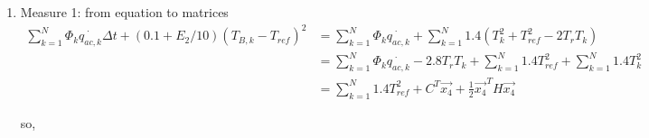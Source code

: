 \documentclass[titlepage,a4paper]{article}
\begin{document}
        \begin{enumerate}
            \item Measure 1: from equation to matrices
            \begin{equation}
                \begin{aligned}
                    \sum_{k=1}^N \Phi_k \dot{q_{ac,k}} \Delta t+(0.1+E_2/10)(T_{B,k}-T_{ref})^2 &= \sum_{k=1}^N \Phi_k \dot{q_{ac,k}}+\sum_{k=1}^N 1.4(T_k^2+T_{ref}^2-2T_r T_k) \\
                    & =  \sum_{k=1}^N \Phi_k \dot{q_{ac,k}} -2.8 T_r T_k +\sum_{k=1}^N 1.4 T_{ref}^2 +\sum_{k=1}^N 1.4 T_k^2 \\
                    & = \sum_{k=1}^N 1.4 T_{ref}^2+ C^T \vec{x_4} + \frac{1}{2}\vec{x_4}^T H \vec{x_4}
                \end{aligned}
            \end{equation}
            
            so,


\end{enumerate}
\end{document}
